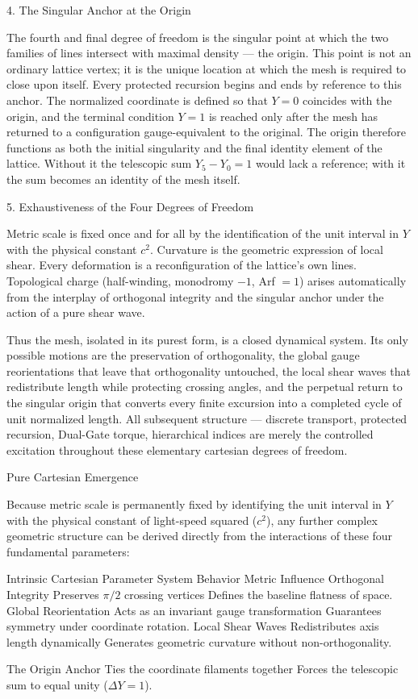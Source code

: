 4. The Singular Anchor at the Origin

The fourth and final degree of freedom is the singular point at which the two families of lines intersect with maximal density — the origin. This point is not an ordinary lattice vertex; it is the unique location at which the mesh is required to close upon itself. Every protected recursion begins and ends by reference to this anchor. The normalized coordinate is defined so that \(Y=0\) coincides with the origin, and the terminal condition \(Y=1\) is reached only after the mesh has returned to a configuration gauge-equivalent to the original. The origin therefore functions as both the initial singularity and the final identity element of the lattice. Without it the telescopic sum \(Y_5-Y_0=1\) would lack a reference; with it the sum becomes an identity of the mesh itself.

5. Exhaustiveness of the Four Degrees of Freedom

Metric scale is fixed once and for all by the identification of the unit interval in \(Y\) with the physical constant \(c^2\). Curvature is the geometric expression of local shear. Every deformation is a reconfiguration of the lattice’s own lines. Topological charge (half-winding, monodromy \(-1\), Arf \(=1\)) arises automatically from the interplay of orthogonal integrity and the singular anchor under the action of a pure shear wave.

Thus the mesh, isolated in its purest form, is a closed dynamical system. Its only possible motions are the preservation of orthogonality, the global gauge reorientations that leave that orthogonality untouched, the local shear waves that redistribute length while protecting crossing angles, and the perpetual return to the singular origin that converts every finite excursion into a completed cycle of unit normalized length. All subsequent structure — discrete transport, protected recursion, Dual-Gate torque, hierarchical indices are merely the controlled excitation throughout these elementary cartesian degrees of freedom.

Pure Cartesian Emergence

Because metric scale is permanently fixed by identifying the unit interval in \(Y\) with the physical constant of light-speed squared (\(c^{2}\)), any further complex geometric structure can be derived directly from the interactions of these four fundamental parameters:

Intrinsic Cartesian Parameter	System Behavior	Metric Influence
Orthogonal Integrity	Preserves \(\pi/2\) crossing vertices	Defines the baseline flatness of space.
Global Reorientation	Acts as an invariant gauge transformation	Guarantees symmetry under coordinate rotation.
Local Shear Waves	Redistributes axis length dynamically	Generates geometric curvature without non-orthogonality.

The Origin Anchor	Ties the coordinate filaments together	Forces the telescopic sum to equal unity (\(\Delta Y = 1\)).

